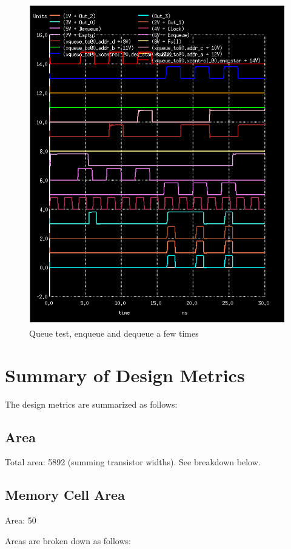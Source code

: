 \documentclass[12pt]{report}
\begin{document}
\begin{figure}[H]
  \centering
    \includegraphics[width=1.0\textwidth]{queue_toplevel_test_enq_deq_a_few_time.PNG}
  \caption{Queue test, enqueue and dequeue a few times}
\end{figure}

\newpage
\section*{Summary of Design Metrics}
The design metrics are summarized as follows:
\subsection*{Area}
Total area: 5892 (summing transistor widths). See breakdown below.
\subsection*{Memory Cell Area}
Area: 50

Areas are broken down as follows:\\
\end{document}

